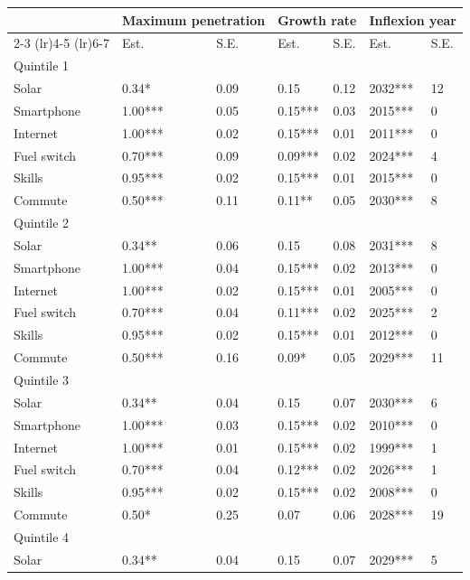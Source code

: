 \begin{tabular}{l{2cm}p{1cm}p{1cm}p{1cm}p{1cm}p{1cm}p{1cm}} \toprule
          & \multicolumn{2}{c}{Maximum penetration} & \multicolumn{2}{c}{Growth rate} & \multicolumn{2}{c}{Inflexion year} \\ 
          \cmidrule(lr){2-3} \cmidrule(lr){4-5} \cmidrule(lr){6-7}
          & Est. & S.E. & Est. & S.E. & Est. & S.E. \\ 
          \midrule 
 Quintile 1& & & & & & \\ \midrule
Solar & 0.34* & 0.09 & 0.15 & 0.12 & 2032*** & 12 \\
Smartphone & 1.00*** & 0.05 & 0.15*** & 0.03 & 2015*** & 0 \\
Internet & 1.00*** & 0.02 & 0.15*** & 0.01 & 2011*** & 0 \\
Fuel switch & 0.70*** & 0.09 & 0.09*** & 0.02 & 2024*** & 4 \\
Skills & 0.95*** & 0.02 & 0.15*** & 0.01 & 2015*** & 0 \\
Commute & 0.50*** & 0.11 & 0.11** & 0.05 & 2030*** & 8 \\\midrule 
Quintile 2& & & & & & \\ \midrule
Solar & 0.34** & 0.06 & 0.15 & 0.08 & 2031*** & 8 \\
Smartphone & 1.00*** & 0.04 & 0.15*** & 0.02 & 2013*** & 0 \\
Internet & 1.00*** & 0.02 & 0.15*** & 0.01 & 2005*** & 0 \\
Fuel switch & 0.70*** & 0.04 & 0.11*** & 0.02 & 2025*** & 2 \\
Skills & 0.95*** & 0.02 & 0.15*** & 0.01 & 2012*** & 0 \\
Commute & 0.50*** & 0.16 & 0.09* & 0.05 & 2029*** & 11 \\\midrule 
Quintile 3& & & & & & \\ \midrule
Solar & 0.34** & 0.04 & 0.15 & 0.07 & 2030*** & 6 \\
Smartphone & 1.00*** & 0.03 & 0.15*** & 0.02 & 2010*** & 0 \\
Internet & 1.00*** & 0.01 & 0.15*** & 0.02 & 1999*** & 1 \\
Fuel switch & 0.70*** & 0.04 & 0.12*** & 0.02 & 2026*** & 1 \\
Skills & 0.95*** & 0.02 & 0.15*** & 0.02 & 2008*** & 0 \\
Commute & 0.50* & 0.25 & 0.07 & 0.06 & 2028*** & 19 \\\midrule 
Quintile 4& & & & & & \\ \midrule
Solar & 0.34** & 0.04 & 0.15 & 0.07 & 2029*** & 5 \\

\end{tabular}
